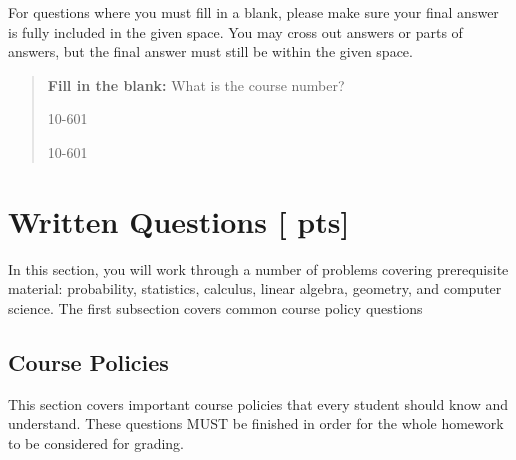 \documentclass[11pt,addpoints,answers]{exam}
\numberwithin{equation}{section} %
\numberwithin{figure}{section} %
\numberwithin{table}{section} %
\newcommand{\pts}[1]{\textbf{[#1 pts]}}
\begin{document}
For questions where you must fill in a blank, please make sure your final answer is fully included in the given space. You may cross out answers or parts of answers, but the final answer must still be within the given space.

\begin{quote}
\textbf{Fill in the blank:} What is the course number?

\begin{tcolorbox}[fit,height=1cm, width=4cm, blank, borderline={1pt}{-2pt},nobeforeafter]
    \begin{center}\huge10-601\end{center}
    \end{tcolorbox}\hspace{2cm}
    \begin{tcolorbox}[fit,height=1cm, width=4cm, blank, borderline={1pt}{-2pt},nobeforeafter]
    \begin{center}\huge10-601\end{center}
    \end{tcolorbox}
\end{quote}

\clearpage
\clearpage

\section{Written Questions \pts{\numpoints{}}}
In this section, you will work through a number of problems covering prerequisite material: probability, statistics, calculus, linear algebra, geometry, and computer science. The first subsection covers common course policy questions

\subsection{Course Policies}
This section covers important course policies that every student should know and understand. These questions MUST be finished in order for the whole homework to be considered for grading.
\end{document}
